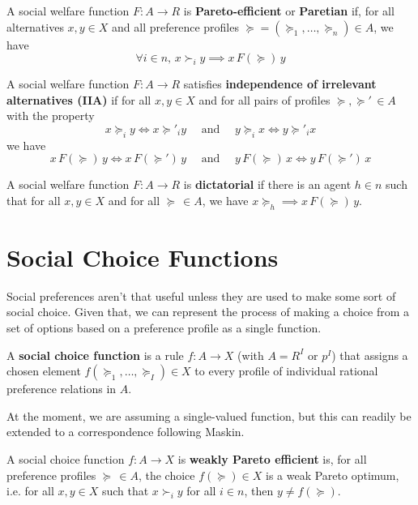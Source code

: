 \documentclass[10pt]{article}
\begin{document}
\begin{spacing}{1.0}
\begin{definition}
  A social welfare function $F:A\to R$ is
  \textbf{Pareto-efficient} or
  \textbf{Paretian} if, for all alternatives
  $x,y \in X$ and all preference profiles
  $\succeq=(\succeq_1, \ldots, \succeq_n)\in A$, we have \[\forall
  i\in n, \, x \succ_i y \implies x \, F(\succeq) \, y\]
\end{definition}

\begin{definition}
  A social welfare function $F:A\to R$ satisfies
  \textbf{independence of irrelevant alternatives (IIA)}  if for
  all $x,y \in X$ and for all pairs of profiles
  $\succeq , \succeq'\, \in A$ with the property \[x\succeq_i y
  \iff x\succeq'_i y \quad\text{ and }\quad y \succeq_i x \iff y
  \succeq'_i x\] we have \[x\, F(\succeq) \, y \iff x
  \,F(\succeq')\, y \quad\text{ and }\quad y\, F(\succeq) \, x \iff y
  \,F(\succeq')\, x\]
\end{definition}

\begin{definition}
  A social welfare function $F: A\to R$ is
  \textbf{dictatorial} if there is an agent $h\in n$ such
  that for all $x,y \in X$ and for all $\succeq \,\in A$, we
  have $x \succeq_h \implies x\, F(\succeq) \, y$.
\end{definition}

\section{Social Choice Functions}

Social preferences aren't that useful unless they are
used to make some sort of social choice. Given that, we
can represent the process of making a choice from a set
of options based on a preference profile as a single function.

\begin{definition}
  A \textbf{social choice function} is a rule $f: A\to X$
  (with $A = R^I$ or $p^I$) that assigns a chosen element
  $f(\succeq_1, \ldots, \succeq_I) \in X$ to every profile
  of individual rational preference relations in $A$.
\end{definition}

At the moment, we are assuming a single-valued function,
but this can readily be extended to a correspondence following Maskin.

\begin{definition}
  A social choice function $f: A \to X$ is \textbf{weakly
    Pareto efficient} is, for all preference profiles
  $\succeq\, \in A$, the choice $f(\succeq) \in X$ is a
  weak Pareto optimum, i.e. for all $x,y\in X$ such that
  $x \succ_i y$ for all $i\in n$, then $y \not = f(\succeq)$.
\end{definition}


\end{spacing}
\end{document}
